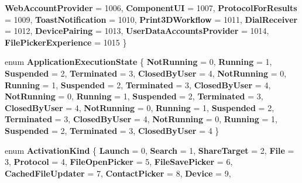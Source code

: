 \begin{DoxyCompactItemize}
{\bfseries Web\+Account\+Provider} = 1006, 
{\bfseries Component\+UI} = 1007, 
{\bfseries Protocol\+For\+Results} = 1009, 
{\bfseries Toast\+Notification} = 1010, 
\newline
{\bfseries Print3\+D\+Workflow} = 1011, 
{\bfseries Dial\+Receiver} = 1012, 
{\bfseries Device\+Pairing} = 1013, 
{\bfseries User\+Data\+Accounts\+Provider} = 1014, 
\newline
{\bfseries File\+Picker\+Experience} = 1015
 \}
\item 
\mbox{\label{namespace_windows_1_1_application_model_1_1_activation_a03c52b98bf1430c4332252ef7e86b265}} 
enum {\bfseries Application\+Execution\+State} \{ \newline
{\bfseries Not\+Running} = 0, 
{\bfseries Running} = 1, 
{\bfseries Suspended} = 2, 
{\bfseries Terminated} = 3, 
\newline
{\bfseries Closed\+By\+User} = 4, 
{\bfseries Not\+Running} = 0, 
{\bfseries Running} = 1, 
{\bfseries Suspended} = 2, 
\newline
{\bfseries Terminated} = 3, 
{\bfseries Closed\+By\+User} = 4, 
{\bfseries Not\+Running} = 0, 
{\bfseries Running} = 1, 
\newline
{\bfseries Suspended} = 2, 
{\bfseries Terminated} = 3, 
{\bfseries Closed\+By\+User} = 4, 
{\bfseries Not\+Running} = 0, 
\newline
{\bfseries Running} = 1, 
{\bfseries Suspended} = 2, 
{\bfseries Terminated} = 3, 
{\bfseries Closed\+By\+User} = 4, 
\newline
{\bfseries Not\+Running} = 0, 
{\bfseries Running} = 1, 
{\bfseries Suspended} = 2, 
{\bfseries Terminated} = 3, 
\newline
{\bfseries Closed\+By\+User} = 4
 \}
\item 
\mbox{\label{namespace_windows_1_1_application_model_1_1_activation_a21aa80ed65cf8b4f5d0d6c3b39f65284}} 
enum {\bfseries Activation\+Kind} \{ \newline
{\bfseries Launch} = 0, 
{\bfseries Search} = 1, 
{\bfseries Share\+Target} = 2, 
{\bfseries File} = 3, 
\newline
{\bfseries Protocol} = 4, 
{\bfseries File\+Open\+Picker} = 5, 
{\bfseries File\+Save\+Picker} = 6, 
{\bfseries Cached\+File\+Updater} = 7, 
\newline
{\bfseries Contact\+Picker} = 8, 
{\bfseries Device} = 9, 

\end{DoxyCompactItemize}
